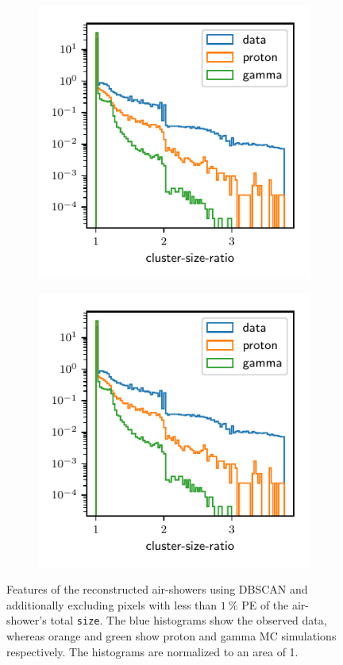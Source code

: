 \begin{figure}
  \begin{subfigure}{0.5\textwidth}
    \includegraphics[width=\textwidth, page=23]{Plots/data_mc/features_DBSCAN_perc.pdf}
  \end{subfigure}
  \begin{subfigure}{0.5\textwidth}
    \includegraphics[width=\textwidth, page=13]{Plots/data_mc/features_DBSCAN_perc.pdf}
  \end{subfigure}
  \caption{Features of the reconstructed air-showers using DBSCAN and additionally excluding pixels with less than $\SI{1}{\percent}$ PE of the air-shower's total \texttt{size}. The blue histograms show the observed data, whereas orange and green show proton and gamma MC simulations respectively. The histograms are normalized to an area of \num{1}.}
  \label{fig:feat_dbscan_perc}
\end{figure}
